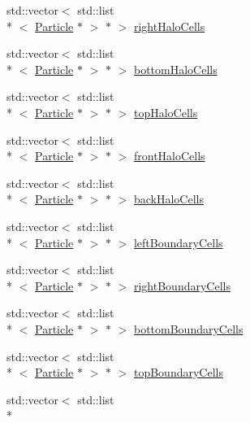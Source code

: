 \begin{DoxyCompactItemize}
\item 
std\-::vector$<$ std\-::list\\*
$<$ \hyperlink{classParticle}{Particle} $\ast$ $>$ $\ast$ $>$ \hyperlink{classutils_1_1LCParticleContainer_a564e78ce48736ad36753ce33935adfb6}{right\-Halo\-Cells}
\item 
std\-::vector$<$ std\-::list\\*
$<$ \hyperlink{classParticle}{Particle} $\ast$ $>$ $\ast$ $>$ \hyperlink{classutils_1_1LCParticleContainer_a7735296727ed8c14d4f6ff99c065bced}{bottom\-Halo\-Cells}
\item 
std\-::vector$<$ std\-::list\\*
$<$ \hyperlink{classParticle}{Particle} $\ast$ $>$ $\ast$ $>$ \hyperlink{classutils_1_1LCParticleContainer_a6b94126cff371182cc606c68a71e0044}{top\-Halo\-Cells}
\item 
std\-::vector$<$ std\-::list\\*
$<$ \hyperlink{classParticle}{Particle} $\ast$ $>$ $\ast$ $>$ \hyperlink{classutils_1_1LCParticleContainer_a242688f7a6578b42ee85c5c309a08a05}{front\-Halo\-Cells}
\item 
std\-::vector$<$ std\-::list\\*
$<$ \hyperlink{classParticle}{Particle} $\ast$ $>$ $\ast$ $>$ \hyperlink{classutils_1_1LCParticleContainer_a0a2c5e53ceca2200e6d18ef4ea738232}{back\-Halo\-Cells}
\item 
std\-::vector$<$ std\-::list\\*
$<$ \hyperlink{classParticle}{Particle} $\ast$ $>$ $\ast$ $>$ \hyperlink{classutils_1_1LCParticleContainer_a9ade06cd7e76d57770ad62900200a63b}{left\-Boundary\-Cells}
\item 
std\-::vector$<$ std\-::list\\*
$<$ \hyperlink{classParticle}{Particle} $\ast$ $>$ $\ast$ $>$ \hyperlink{classutils_1_1LCParticleContainer_a9ddcb12f783f403327f9c45c7fc7b69f}{right\-Boundary\-Cells}
\item 
std\-::vector$<$ std\-::list\\*
$<$ \hyperlink{classParticle}{Particle} $\ast$ $>$ $\ast$ $>$ \hyperlink{classutils_1_1LCParticleContainer_a2d7ae0438fdc4fb9f014c8465775c8d1}{bottom\-Boundary\-Cells}
\item 
std\-::vector$<$ std\-::list\\*
$<$ \hyperlink{classParticle}{Particle} $\ast$ $>$ $\ast$ $>$ \hyperlink{classutils_1_1LCParticleContainer_af4c6176f13f695f7f368630a05a4775e}{top\-Boundary\-Cells}
\item 
std\-::vector$<$ std\-::list\\*

\end{DoxyCompactItemize}
